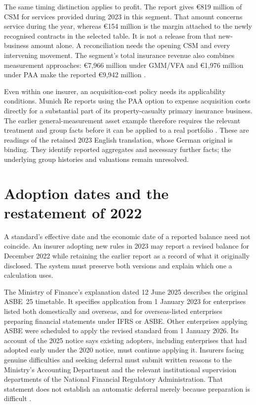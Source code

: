 The same timing distinction applies to profit. The report gives
€819 million of CSM for services provided during 2023 in this segment.
That amount concerns service during the year, whereas €154 million is
the margin attached to the newly recognised contracts in the selected table.
It is not a release from that new-business amount alone. A reconciliation
needs the opening CSM and every intervening movement. The segment's total
insurance revenue also combines measurement approaches: €7,966 million
under GMM/VFA and €1,976 million under PAA make the reported
€9,942 million \citep[printed pp. 253, 264]{munichre2023annual}.

Even within one insurer, an acquisition-cost policy needs its applicability
conditions. Munich Re reports using the PAA option to expense acquisition
costs directly for a substantial part of its property-casualty primary
insurance business. The earlier general-measurement asset example therefore
requires the relevant treatment and group facts before it can be applied to
a real portfolio \citep[printed p. 166]{munichre2023annual}. These are readings
of the retained 2023 English translation, whose German original is binding.
They identify reported aggregates and necessary further facts; the underlying
group histories and valuations remain unresolved.

\clearpage
\section{Adoption dates and the restatement of 2022}
\label{sec:insurance-adoption}

A standard's effective date and the economic date of a reported balance need
not coincide. An insurer adopting new rules in 2023 may report a revised
balance for December 2022 while retaining the earlier report as a record of
what it originally disclosed. The system must preserve both versions and
explain which one a calculation uses.

The Ministry of Finance's explanation dated 12 June 2025 describes the original
ASBE~25 timetable. It specifies application from 1 January 2023 for enterprises
listed both domestically and overseas, and for overseas-listed enterprises
preparing financial statements under IFRS or ASBE. Other enterprises applying
ASBE were scheduled to apply the revised standard from 1 January 2026.
Its account of the
2025 notice says existing adopters, including enterprises that had adopted
early under the 2020 notice, must continue applying it. Insurers facing genuine
difficulties and seeking deferral must submit written reasons to the Ministry's
Accounting Department and the relevant institutional supervision departments
of the National Financial Regulatory Administration. That statement does not
establish an automatic deferral merely because preparation is difficult
\citep[answers on background and implementation arrangements]{mofinsurance2025qa}.


